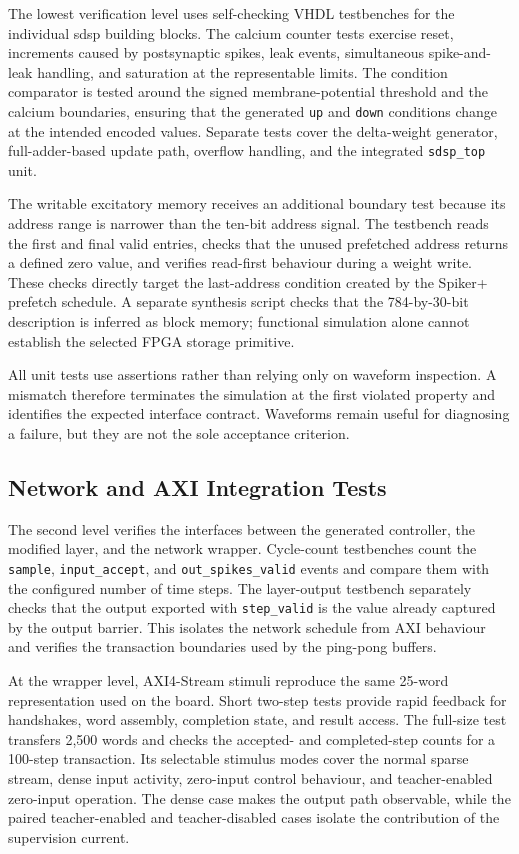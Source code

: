 The lowest verification level uses self-checking VHDL testbenches for the individual \gls{sdsp} building blocks. The calcium counter tests exercise reset, increments caused by postsynaptic spikes, leak events, simultaneous spike-and-leak handling, and saturation at the representable limits. The condition comparator is tested around the signed membrane-potential threshold and the calcium boundaries, ensuring that the generated \texttt{up} and \texttt{down} conditions change at the intended encoded values. Separate tests cover the delta-weight generator, full-adder-based update path, overflow handling, and the integrated \texttt{sdsp\_top} unit.

The writable excitatory memory receives an additional boundary test because its address range is narrower than the ten-bit address signal. The testbench reads the first and final valid entries, checks that the unused prefetched address returns a defined zero value, and verifies read-first behaviour during a weight write. These checks directly target the last-address condition created by the Spiker+ prefetch schedule. A separate synthesis script checks that the 784-by-30-bit description is inferred as block memory; functional simulation alone cannot establish the selected FPGA storage primitive.

All unit tests use assertions rather than relying only on waveform inspection. A mismatch therefore terminates the simulation at the first violated property and identifies the expected interface contract. Waveforms remain useful for diagnosing a failure, but they are not the sole acceptance criterion.

\subsection{Network and AXI Integration Tests}

The second level verifies the interfaces between the generated controller, the modified layer, and the network wrapper. Cycle-count testbenches count the \texttt{sample}, \texttt{input\_accept}, and \texttt{out\_spikes\_valid} events and compare them with the configured number of time steps. The layer-output testbench separately checks that the output exported with \texttt{step\_valid} is the value already captured by the output barrier. This isolates the network schedule from AXI behaviour and verifies the transaction boundaries used by the ping-pong buffers.

At the wrapper level, AXI4-Stream stimuli reproduce the same 25-word representation used on the board. Short two-step tests provide rapid feedback for handshakes, word assembly, completion state, and result access. The full-size test transfers 2,500 words and checks the accepted- and completed-step counts for a 100-step transaction. Its selectable stimulus modes cover the normal sparse stream, dense input activity, zero-input control behaviour, and teacher-enabled zero-input operation. The dense case makes the output path observable, while the paired teacher-enabled and teacher-disabled cases isolate the contribution of the supervision current.

